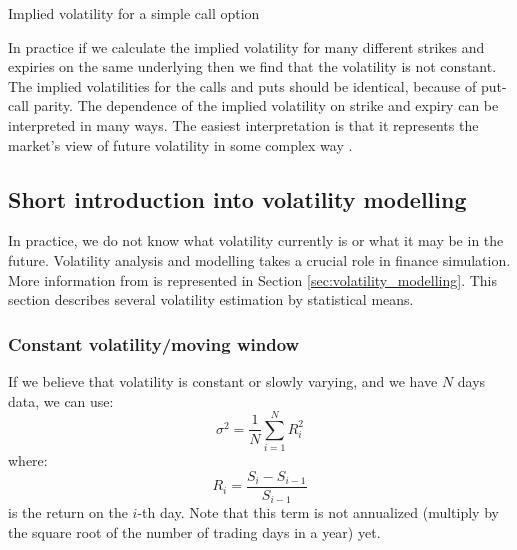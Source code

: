 \vspace{\baselineskip}
\begin{algorithm}[H]
\caption{Implied volatility for a simple call option}
\label{algo:imp_vol_simple_call}  
\end{algorithm}
\vspace{\baselineskip}

In practice if we calculate the implied volatility for many different strikes and expiries on the same underlying then we find that the volatility is not constant. The implied volatilities for the calls and puts should be identical, because of put-call parity. The dependence of the implied volatility on strike and expiry can be interpreted in many ways. The easiest interpretation is that it represents the market's view of future volatility in some complex way \cite{pw_iqf2ed_2007}.



\subsection{Short introduction into volatility modelling}
In practice, we do not know what volatility currently is or what it may be in the future. Volatility analysis and modelling takes a crucial role in finance simulation. More information from \cite{pw_iqf2ed_2007} is represented in Section \ref{sec:volatility_modelling}. This section describes several volatility estimation by statistical means.

\subsubsection{Constant volatility/moving window}
If we believe that volatility is constant or slowly varying, and we have $N$ days data, we can use:
\begin{equation}
    \sigma^2 = \frac{1}{N} \sum_{i=1}^N R_i^2
\end{equation}
where:
\begin{equation}
	R_i = \frac{S_i - S_{i-1}}{S_{i-1}}
\end{equation}
is the return on the $i$-th day. Note that this term is not annualized (multiply by the square root of the number of trading days in a year) yet. 


